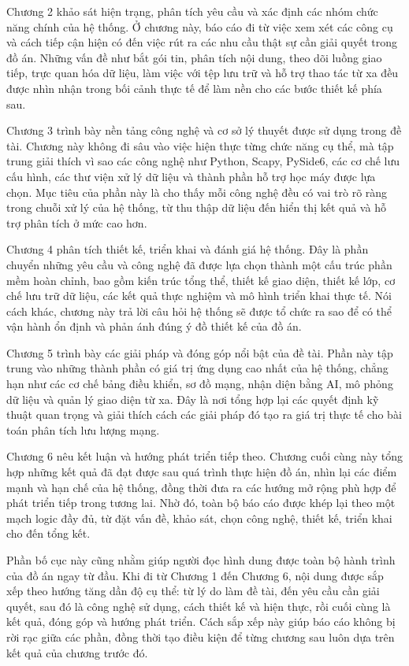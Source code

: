 \documentclass[../DoAn.tex]{subfiles}
\begin{document}
Chương 2 khảo sát hiện trạng, phân tích yêu cầu và xác định các nhóm chức năng chính của hệ thống. Ở chương này, báo cáo đi từ việc xem xét các công cụ và cách tiếp cận hiện có đến việc rút ra các nhu cầu thật sự cần giải quyết trong đồ án. Những vấn đề như bắt gói tin, phân tích nội dung, theo dõi luồng giao tiếp, trực quan hóa dữ liệu, làm việc với tệp lưu trữ và hỗ trợ thao tác từ xa đều được nhìn nhận trong bối cảnh thực tế để làm nền cho các bước thiết kế phía sau.

Chương 3 trình bày nền tảng công nghệ và cơ sở lý thuyết được sử dụng trong đề tài. Chương này không đi sâu vào việc hiện thực từng chức năng cụ thể, mà tập trung giải thích vì sao các công nghệ như Python, Scapy, PySide6, các cơ chế lưu cấu hình, các thư viện xử lý dữ liệu và thành phần hỗ trợ học máy được lựa chọn. Mục tiêu của phần này là cho thấy mỗi công nghệ đều có vai trò rõ ràng trong chuỗi xử lý của hệ thống, từ thu thập dữ liệu đến hiển thị kết quả và hỗ trợ phân tích ở mức cao hơn.

Chương 4 phân tích thiết kế, triển khai và đánh giá hệ thống. Đây là phần chuyển những yêu cầu và công nghệ đã được lựa chọn thành một cấu trúc phần mềm hoàn chỉnh, bao gồm kiến trúc tổng thể, thiết kế giao diện, thiết kế lớp, cơ chế lưu trữ dữ liệu, các kết quả thực nghiệm và mô hình triển khai thực tế. Nói cách khác, chương này trả lời câu hỏi hệ thống sẽ được tổ chức ra sao để có thể vận hành ổn định và phản ánh đúng ý đồ thiết kế của đồ án.

Chương 5 trình bày các giải pháp và đóng góp nổi bật của đề tài. Phần này tập trung vào những thành phần có giá trị ứng dụng cao nhất của hệ thống, chẳng hạn như các cơ chế bảng điều khiển, sơ đồ mạng, nhận diện bằng AI, mô phỏng dữ liệu và quản lý giao diện từ xa. Đây là nơi tổng hợp lại các quyết định kỹ thuật quan trọng và giải thích cách các giải pháp đó tạo ra giá trị thực tế cho bài toán phân tích lưu lượng mạng.

Chương 6 nêu kết luận và hướng phát triển tiếp theo. Chương cuối cùng này tổng hợp những kết quả đã đạt được sau quá trình thực hiện đồ án, nhìn lại các điểm mạnh và hạn chế của hệ thống, đồng thời đưa ra các hướng mở rộng phù hợp để phát triển tiếp trong tương lai. Nhờ đó, toàn bộ báo cáo được khép lại theo một mạch logic đầy đủ, từ đặt vấn đề, khảo sát, chọn công nghệ, thiết kế, triển khai cho đến tổng kết.

Phần bố cục này cũng nhằm giúp người đọc hình dung được toàn bộ hành trình của đồ án ngay từ đầu. Khi đi từ Chương 1 đến Chương 6, nội dung được sắp xếp theo hướng tăng dần độ cụ thể: từ lý do làm đề tài, đến yêu cầu cần giải quyết, sau đó là công nghệ sử dụng, cách thiết kế và hiện thực, rồi cuối cùng là kết quả, đóng góp và hướng phát triển. Cách sắp xếp này giúp báo cáo không bị rời rạc giữa các phần, đồng thời tạo điều kiện để từng chương sau luôn dựa trên kết quả của chương trước đó.
\end{document}
